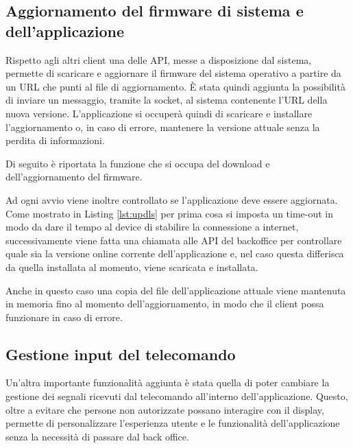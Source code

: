 \subsection{Aggiornamento del firmware di sistema e dell'applicazione}\label{update}

Rispetto agli altri client una delle API, messe a disposizione dal sistema, permette di scaricare e aggiornare il firmware del sistema operativo a partire da un URL che punti al file di aggiornamento.
È stata quindi aggiunta la possibilità di inviare un messaggio, tramite la socket, al sistema contenente l'URL della nuova versione. L'applicazione si occuperà quindi di scaricare e installare l'aggiornamento o, in caso di errore, mantenere la versione attuale senza la perdita di informazioni.

Di seguito è riportata la funzione che si occupa del download e dell'aggiornamento del firmware.



Ad ogni avvio viene inoltre controllato se l'applicazione deve essere aggiornata.
Come mostrato in Listing \ref*{lst:updls} per prima cosa si imposta un time-out in modo da dare il tempo al device di stabilire la connessione a internet, successivamente viene fatta una chiamata alle API del backoffice per controllare quale sia la versione online corrente dell'applicazione e, nel caso questa differisca da quella installata al momento, viene scaricata e installata.



Anche in questo caso una copia del file dell'applicazione attuale viene mantenuta in memoria fino al momento dell'aggiornamento, in modo che il client possa funzionare in caso di errore.

\subsection{Gestione input del telecomando}

Un'altra importante funzionalità aggiunta è stata quella di poter cambiare la gestione dei segnali ricevuti dal telecomando  all'interno dell'applicazione.
Questo, oltre a evitare che persone non autorizzate possano interagire con il display, permette di personalizzare l'esperienza utente e le funzionalità dell'applicazione senza la necessità di passare dal back office.

